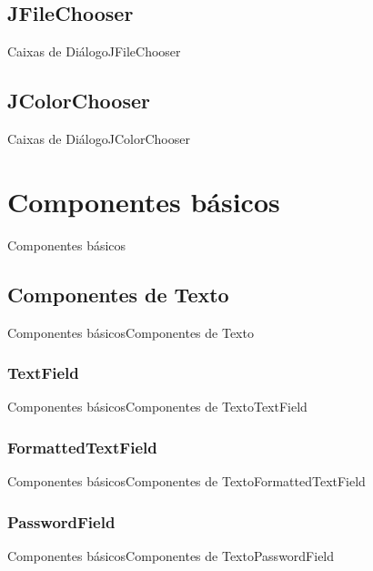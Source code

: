 \documentclass[10pt]{beamer}
\begin{document}
\subsection{JFileChooser}
\begin{frame}{Caixas de Diálogo}{JFileChooser}
\end{frame}{}

\subsection{JColorChooser}
\begin{frame}{Caixas de Diálogo}{JColorChooser}
\end{frame}{}


\section{Componentes básicos}
\begin{frame}{Componentes básicos}{}
\end{frame}{}

\subsection{Componentes de Texto}
\begin{frame}{Componentes básicos}{Componentes de Texto}
\end{frame}{}

\subsubsection{TextField}
\begin{frame}{Componentes básicos}{Componentes de Texto}{TextField}
\end{frame}{}

\subsubsection{FormattedTextField}
\begin{frame}{Componentes básicos}{Componentes de Texto}{FormattedTextField}
\end{frame}{}

\subsubsection{PasswordField}
\begin{frame}{Componentes básicos}{Componentes de Texto}{PasswordField}
\end{frame}{}
\end{document}
